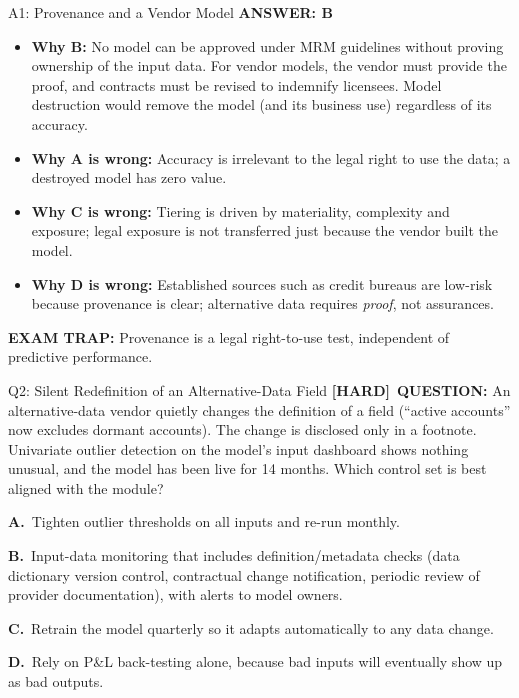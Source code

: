 \documentclass[8pt]{beamer}
\newcommand{\fs}{\fontsize{10}{12}\selectfont}
\newcommand{\opts}[4]{\par\vspace{0.12cm}\noindent\textbf{A.}~#1\par\vspace{0.08cm}\noindent\textbf{B.}~#2\par\vspace{0.08cm}\noindent\textbf{C.}~#3\par\vspace{0.08cm}\noindent\textbf{D.}~#4\par}
\newcommand{\ans}[1]{\textcolor{myblue}{\textbf{ANSWER: #1}}}
\newcommand{\trap}[1]{\textcolor{myred}{\textbf{EXAM TRAP:}} #1}
\newcommand{\hard}{\textcolor{myorange}{\textbf{[HARD]}}}
\begin{document}
\begin{frame}[t]{A1: Provenance and a Vendor Model}
\fs
\ans{B}
\begin{itemize}
\item \textbf{Why B:} No model can be approved under MRM guidelines without proving ownership of the input data. For vendor models, the vendor must provide the proof, and contracts must be revised to indemnify licensees. Model destruction would remove the model (and its business use) regardless of its accuracy.
\item \textbf{Why A is wrong:} Accuracy is irrelevant to the legal right to use the data; a destroyed model has zero value.
\item \textbf{Why C is wrong:} Tiering is driven by materiality, complexity and exposure; legal exposure is not transferred just because the vendor built the model.
\item \textbf{Why D is wrong:} Established sources such as credit bureaus are low-risk because provenance is clear; alternative data requires \emph{proof}, not assurances.
\end{itemize}
\trap{Provenance is a \textcolor{myblue}{legal right-to-use} test, independent of predictive performance.}
\end{frame}

\begin{frame}[t]{Q2: Silent Redefinition of an Alternative-Data Field}
\fs
\hard\ \textbf{QUESTION:} An alternative-data vendor quietly changes the definition of a field (``active accounts'' now excludes dormant accounts). The change is disclosed only in a footnote. Univariate outlier detection on the model's input dashboard shows nothing unusual, and the model has been live for 14 months. Which control set is best aligned with the module?
\opts{Tighten outlier thresholds on all inputs and re-run monthly.}
{Input-data monitoring that includes definition/metadata checks (data dictionary version control, contractual change notification, periodic review of provider documentation), with alerts to model owners.}
{Retrain the model quarterly so it adapts automatically to any data change.}
{Rely on P\&L back-testing alone, because bad inputs will eventually show up as bad outputs.}
\end{frame}
\end{document}
